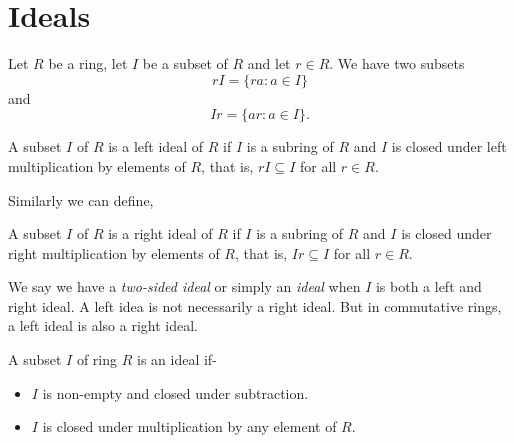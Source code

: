 \section{Ideals}
Let $R$ be a ring, let $I$ be a subset of $R$ and let $r \in R$. We have two subsets 
\[rI = \{ra: a \in I\}\]
and
\[Ir = \{ar: a \in I\}.\]
\begin{definition}
    A subset $I$ of $R$ is a left ideal of $R$ if $I$ is a subring of $R$ and $I$ is closed under left multiplication by elements of $R$, that is, $rI \subseteq I$ for all $r \in R$.
\end{definition}
Similarly we can define,
\begin{definition}
    A subset $I$ of $R$ is a right ideal of $R$ if $I$ is a subring of $R$ and $I$ is closed under right multiplication by elements of $R$, that is, $Ir \subseteq I$ for all $r \in R$.
\end{definition}
We say we have a \textit{two-sided ideal} or simply an \textit{ideal} when $I$ is both a left and right ideal. A left idea is not necessarily a right ideal. But in commutative rings, a left ideal is also a right ideal.
\begin{lemma}
    A subset $I$ of ring $R$ is an ideal if-
    \begin{itemize}
        \item $I$ is non-empty and closed under subtraction.
        \item $I$ is closed under multiplication by any element of $R$.
    \end{itemize}
\end{lemma}
